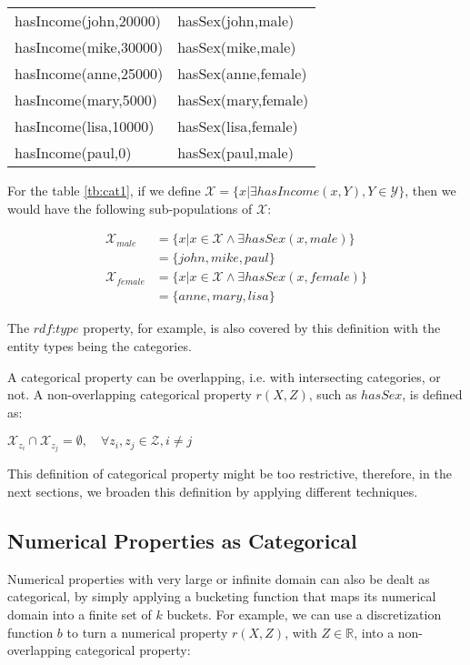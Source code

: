 \begin{tabular}{*{2}{l}}
\label{tb:cat1}
  hasIncome(john,20000) & hasSex(john,male) 	\\
  hasIncome(mike,30000) & hasSex(mike,male) 	\\
  hasIncome(anne,25000) & hasSex(anne,female) 	\\
  hasIncome(mary,5000) 	& hasSex(mary,female) 	\\
  hasIncome(lisa,10000) & hasSex(lisa,female)	\\
  hasIncome(paul,0)	& hasSex(paul,male)	\\
\end{tabular}

For the table \ref{tb:cat1}, if we define $\mathcal{X}=\{ x|\exists hasIncome(x,Y), Y \in \mathcal{Y} \}$, then we would
have the following sub-populations of $\mathcal{X}$:

\begin{align*}
 \mathcal{X}_{male}&=\{ x|x \in \mathcal{X} \wedge \exists hasSex(x,male)\} \\
  &=\{john,mike,paul\} \\
\mathcal{X}_{female}&=\{ x|x \in \mathcal{X} \wedge \exists hasSex(x,female)\} \\
  &=\{anne,mary,lisa\}
\end{align*}


The $rdf$:$type$ property, for example, is also covered by this definition with the entity types being the categories.

A categorical property can be overlapping, i.e. with intersecting categories, or not. A non-overlapping categorical
property $r(X,Z)$, such as $hasSex$, is defined as:

$\mathcal{X}_{z_i} \cap \mathcal{X}_{z_j} = \emptyset, \quad \forall z_i,z_j \in \mathcal{Z}, i \neq j$

This definition of categorical property might be too restrictive, therefore, in the next sections, we broaden this
definition by applying different techniques.

\subsection{Numerical Properties as Categorical}

Numerical properties with very large or infinite domain can also be dealt as categorical, by simply applying a bucketing
function that maps its numerical domain into a finite set of $k$ buckets. For example, we can use a discretization
function $b$ to turn a numerical property $r(X,Z)$, with $Z \in \mathbb{R}$, into a non-overlapping categorical
property:

